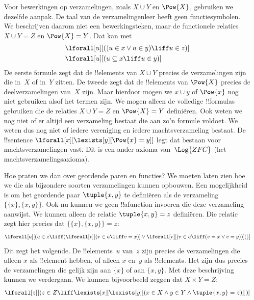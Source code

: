 \documentclass[openany]{memoir}
\begin{document}
Voor bewerkingen op verzamelingen, zoals $X \cup Y$ en $\Pow{X}$,
gebruiken we dezelfde aanpak. De taal van de verzamelingenleer heeft
geen functiesymbolen. We beschrijven daarom niet een bewerkingsteken,
maar de functionele relaties $X \cup Y = Z$ en $\Pow{X} = Y$. Dat kan
met
\begin{align*}
& \lforall[u][((u \in x \lor u \in y) \liff u \in z)]\\
& \lforall[u][(u \subseteq x \liff u \in y )]
\end{align*}
De eerste formule zegt dat de !!{element}s van $X \cup Y$ precies de
verzamelingen zijn die in~$X$ of in~$Y$ zitten. De tweede zegt dat de
!!{element}s van $\Pow{X}$ precies de deelverzamelingen van~$X$ zijn.
Maar hierdoor mogen we $x \cup y$ of $\Pow{x}$ nog niet gebruiken alsof
het termen zijn. We mogen alleen de volledige !!{formula}s gebruiken
die de relaties $X \cup Y = Z$ en $\Pow{X} = Y$ definiëren. Ook weten
we nog niet of er altijd een verzameling bestaat die aan zo'n formule
voldoet. We weten dus nog niet of iedere vereniging en iedere
machtsverzameling bestaat. De !!{sentence}
$\lforall[x][\lexists[y][\Pow{x} = y]]$ legt dat bestaan voor
machtsverzamelingen vast. Dit is een ander axioma van~$\Log{ZFC}$ (het
machtsverzamelingsaxioma).

Hoe praten we dan over geordende paren en functies? We moeten laten
zien hoe we die als bijzondere soorten verzamelingen kunnen opbouwen.
Een mogelijkheid is om het geordende paar $\tuple{x, y}$ te definiëren
als de verzameling $\{\{x\}, \{x, y\}\}$. Ook nu kunnen we geen
!!a{function} invoeren die deze verzameling aanwijst. We kunnen alleen
de relatie $\tuple{x, y} = z$ definiëren. Die relatie zegt hier precies
dat $\{\{x\}, \{x, y\}\} = z$:
\[
\lforall[u][(u \in z \liff (\lforall[v][(v \in u \liff v = x)] \lor
  \lforall[v][(v \in u \liff (v = x \lor v = y))]))]
\]
Dit zegt het volgende. De !!{element}s~$u$ van~$z$ zijn precies de
verzamelingen die alleen $x$ als !!{element} hebben, of alleen $x$
en~$y$ als !!{element}s. Het zijn dus precies de verzamelingen die
gelijk zijn aan $\{x\}$ of aan $\{x, y\}$. Met deze beschrijving kunnen
we verdergaan. We kunnen bijvoorbeeld zeggen dat $X \times Y = Z$:
\[
\lforall[z][(z \in Z \liff \lexists[x][\lexists[y][(x \in
        X \land y \in Y \land \tuple{x, y} = z)]])]
\]
\end{document}
